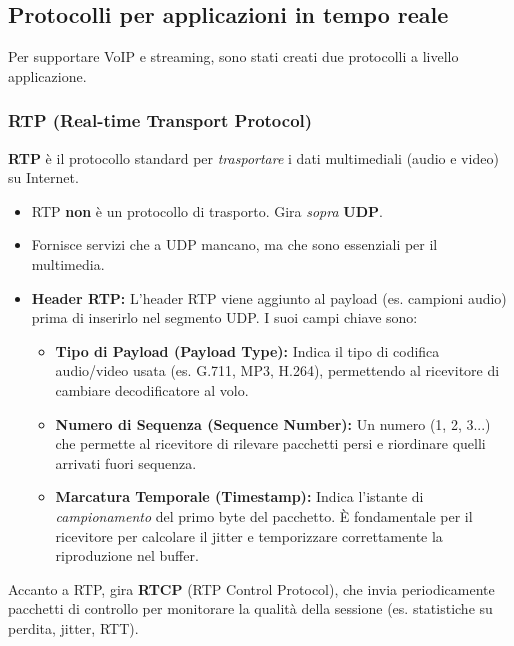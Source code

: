 \subsection{Protocolli per applicazioni in tempo reale}
Per supportare VoIP e streaming, sono stati creati due protocolli a livello applicazione.

\subsubsection{RTP (Real-time Transport Protocol)}
\textbf{RTP} è il protocollo standard per \textit{trasportare} i dati multimediali (audio e video) su Internet.
\begin{itemize}
    \item RTP \textbf{non} è un protocollo di trasporto. Gira \textit{sopra} \textbf{UDP}.
    \item Fornisce servizi che a UDP mancano, ma che sono essenziali per il multimedia.
    \item \textbf{Header RTP:} L'header RTP viene aggiunto al payload (es. campioni audio) prima di inserirlo nel segmento UDP. I suoi campi chiave sono:
        \begin{itemize}
            \item \textbf{Tipo di Payload (Payload Type):} Indica il tipo di codifica audio/video usata (es. G.711, MP3, H.264), permettendo al ricevitore di cambiare decodificatore al volo.
            \item \textbf{Numero di Sequenza (Sequence Number):} Un numero (1, 2, 3...) che permette al ricevitore di rilevare pacchetti persi e riordinare quelli arrivati fuori sequenza.
            \item \textbf{Marcatura Temporale (Timestamp):} Indica l'istante di \textit{campionamento} del primo byte del pacchetto. È fondamentale per il ricevitore per calcolare il jitter e temporizzare correttamente la riproduzione nel buffer.
        \end{itemize}
\end{itemize}
Accanto a RTP, gira \textbf{RTCP} (RTP Control Protocol), che invia periodicamente pacchetti di controllo per monitorare la qualità della sessione (es. statistiche su perdita, jitter, RTT).

